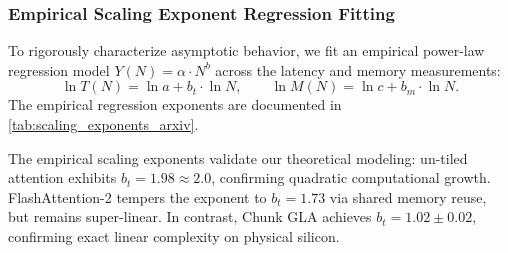 \subsubsection{Empirical Scaling Exponent Regression Fitting}
\label{sec:results_scaling_exponents}

To rigorously characterize asymptotic behavior, we fit an empirical power-law regression model $Y(N) = \alpha \cdot N^b$ across the latency and memory measurements:
\begin{equation}
\label{eq:power_law_fit}
\ln T(N) = \ln a + b_t \cdot \ln N, \qquad \ln M(N) = \ln c + b_m \cdot \ln N.
\end{equation}
The empirical regression exponents are documented in \cref{tab:scaling_exponents_arxiv}.

\begin{table}[t]
\centering
\small
\caption[Latency and Memory Scaling Exponents Across Contexts]{\textbf{Empirical Latency and Memory Scaling Exponents Across Context Lengths ($N \in [512, 16384]$).} Power-law regression slope $b$ from $\ln Y = \ln \alpha + b \ln N$. FlashAttention exhibits near-quadratic latency scaling ($b_t = 1.73$), while Chunk GLA demonstrates near-perfect linear scaling ($b_t = 1.02$).}
\label{tab:scaling_exponents_arxiv}
\end{table}

The empirical scaling exponents validate our theoretical modeling: un-tiled attention exhibits $b_t = 1.98 \approx 2.0$, confirming quadratic computational growth. FlashAttention-2 tempers the exponent to $b_t = 1.73$ via shared memory reuse, but remains super-linear. In contrast, Chunk GLA achieves $b_t = 1.02 \pm 0.02$, confirming exact linear complexity on physical silicon.

